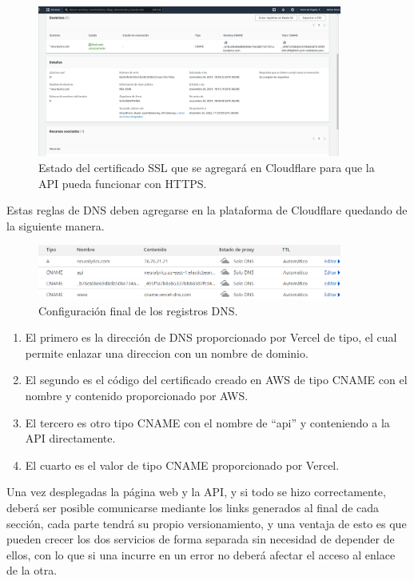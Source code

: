 \documentclass[12pt, a4paper, titlepage]{article}
\begin{document}
	\begin{figure}[H] 
		\includegraphics[width=10cm]{./Imagenes/DnsSSL/DNS_aws.png}
		\centering \caption{Estado del certificado SSL que se agregará en Cloudflare para que la API pueda funcionar con HTTPS.}
	\end{figure}
	Estas reglas de DNS deben agregarse en la plataforma de Cloudflare quedando de la siguiente manera.
	\begin{figure}[H] 
		\includegraphics[width=10cm]{./Imagenes/DnsSSL/Config_DNS.png}
		\centering \caption{Configuración final de los registros DNS.}
	\end{figure}
	\begin{enumerate}
	\item El primero es la dirección de DNS proporcionado por Vercel de tipo, el cual permite enlazar una direccion con un nombre de dominio.
	\item El segundo es el código del certificado creado en AWS de tipo CNAME con el nombre y contenido proporcionado por AWS.
	\item El tercero es otro tipo CNAME con el nombre de “api” y conteniendo a la API directamente.
	\item El cuarto es el valor de tipo CNAME proporcionado por Vercel.
	\end{enumerate}
	Una vez desplegadas la página web y la API, y si todo se hizo correctamente, deberá ser posible comunicarse mediante los links generados al final de cada sección, cada parte tendrá su propio versionamiento, y una ventaja de esto es que pueden crecer los dos servicios de forma separada sin necesidad de depender de ellos, con lo que si una incurre en un error no deberá afectar el acceso al enlace de la otra.
	\newpage
\end{document}
